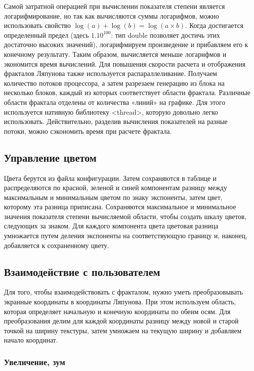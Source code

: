 \documentclass[a5paper,10pt, twoside]{article} %
\begin{document}
	Самой затратной операцией при вычислении показателя степени является логарифмирование, но так как вычисляются суммы логарифмов, 
  можно использовать свойство $\log(a) + \log(b) = \log(a \times b)$.
	Когда достигается определенный предел (здесь $1.10^{100}$: тип double позволяет достичь этих достаточно высоких значений), 
  логарифмируем произведение и прибавляем его к конечному результату.
  Таким образом, вычисляется меньше логарифмов и экономится время вычислений.
  Для повышения скорости расчета и отображения фракталов Ляпунова также используется распараллеливание.
  Получаем количество потоков процессора, а затем разрезаем генерацию из блока на 
  несколько блоков, каждый из которых соответствует области фрактала.
  Различные области фрактала отделены от количества «линий» на графике.
  Для этого используется нативную библиотеку <thread>, которую довольно легко использовать.
  Действительно, разделив вычисления показателей на разные потоки, можно сэкономить время при расчете фрактала.

  \subsection{Управление цветом}

	Цвета берутся из файла конфигурации.
  Затем сохраняются в таблице и распределяются по красной, зеленой и синей компонентам 
  разницу между максимальным и минимальным цветом по знаку экспоненты, затем цвет, которому эта разница приписана.
  Сохраняются максимальное и минимальное значения показателя степени вычисляемой области, чтобы создать шкалу цветов, 
  следующих за знаком. Для каждого компонента цвета цветовая разница умножается путем деления экспоненты на 
  соответствующую границу и, наконец, добавляется к сохраненному цвету.

	\subsection{Взаимодействие с пользователем}

  Для того, чтобы взаимодействовать с фракталом, нужно уметь преобразовывать экранные координаты в координаты Ляпунова.
  При этом используем область, которая определяет начальную и конечную координаты по обеим осям.
  Для преобразования делим для каждой координаты разницу между новой и старой точкой на ширину текстуры, 
  затем умножаем на текущую ширину и добавляем начало координат.

  \subsubsection{Увеличение, зум}
\end{document}
